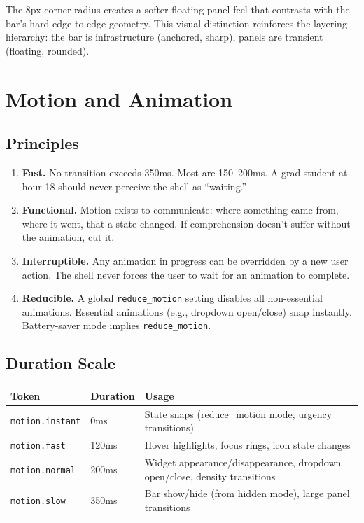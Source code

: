 \documentclass[11pt,a4paper]{article}
\begin{document}
The 8px corner radius creates a softer floating-panel feel that contrasts with the bar's hard edge-to-edge geometry. This visual distinction reinforces the layering hierarchy: the bar is infrastructure (anchored, sharp), panels are transient (floating, rounded).


\section{Motion and Animation}
\label{sec:motion}

\subsection{Principles}

\begin{enumerate}[leftmargin=1.5em, itemsep=3pt]
  \item \textbf{Fast.} No transition exceeds 350ms. Most are 150--200ms. A grad student at hour 18 should never perceive the shell as ``waiting.''
  \item \textbf{Functional.} Motion exists to communicate: where something came from, where it went, that a state changed. If comprehension doesn't suffer without the animation, cut it.
  \item \textbf{Interruptible.} Any animation in progress can be overridden by a new user action. The shell never forces the user to wait for an animation to complete.
  \item \textbf{Reducible.} A global \texttt{reduce\_motion} setting disables all non-essential animations. Essential animations (e.g., dropdown open/close) snap instantly. Battery-saver mode implies \texttt{reduce\_motion}.
\end{enumerate}

\subsection{Duration Scale}

\begin{longtable}{p{3cm} p{2cm} p{8.5cm}}
\toprule
\textbf{Token} & \textbf{Duration} & \textbf{Usage} \\
\midrule
\texttt{motion.instant} & 0ms & State snaps (reduce\_motion mode, urgency transitions) \\
\texttt{motion.fast} & 120ms & Hover highlights, focus rings, icon state changes \\
\texttt{motion.normal} & 200ms & Widget appearance/disappearance, dropdown open/close, density transitions \\
\texttt{motion.slow} & 350ms & Bar show/hide (from hidden mode), large panel transitions \\
\bottomrule
\end{longtable}
\end{document}
